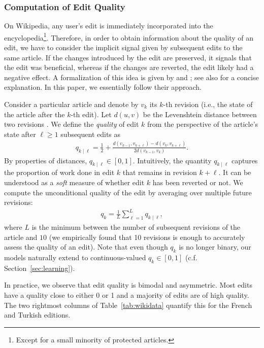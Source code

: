 \subsubsection{Computation of Edit Quality}

On Wikipedia, any user's edit is immediately incorporated into the encyclopedia\footnote{Except for a small minority of protected articles.}.
Therefore, in order to obtain information about the quality of an edit, we have to consider the implicit signal given by subsequent edits to the same article.
If the changes introduced by the edit are preserved, it signals that the edit was beneficial, whereas if the changes are reverted, the edit likely had a negative effect.
A formalization of this idea is given by \citet{adler2007content} and \citet{druck2008learning};
see also \citet{dealfaro2013content} for a concise explanation.
In this paper, we essentially follow their approach.

Consider a particular article and denote by $v_k$ its $k$-th revision (i.e., the state of the article after the $k$-th edit).
Let $d(u, v)$ be the Levenshtein distance between two revisions \citep{kruskal1983overview}.
We define the \emph{quality} of edit $k$ from the perspective of the article's state after $\ell \ge 1$ subsequent edits as
\begin{align*}
	q_{k \mid \ell} = \frac{1}{2} + \frac{d(v_{k-1}, v_{k + \ell}) - d(v_k, v_{k + \ell})}{2 d(v_{k-1}, v_k)}.
\end{align*}
By properties of distances, $q_{k \mid \ell} \in [0, 1]$.
Intuitively, the quantity $q_{k \mid \ell}$ captures the proportion of work done in edit $k$ that remains in revision $k + \ell$.
It can be understood as a \emph{soft} measure of whether edit $k$ has been reverted or not.
We compute the unconditional quality of the edit by averaging over multiple future revisions:
\begin{align}
	\label{eq:wikiqual}
	q_k = \frac{1}{L} \sum_{\ell = 1}^L q_{k \mid \ell},
\end{align}
where $L$ is the minimum between the number of subsequent revisions of the article and $10$ (we empirically found that \num{10} revisions is enough to accurately assess the quality of an edit).
Note that even though $q_k$ is no longer binary, our models naturally extend to continuous-valued $q_k \in [0,1]$ (c.f. Section~\ref{sec:learning}).

In practice, we observe that edit quality is bimodal and asymmetric.
Most edits have a quality close to either \num{0} or \num{1} and a majority of edits are of high quality.
The two rightmost columns of Table~\ref{tab:wikidata} quantify this for the French and Turkish editions.

